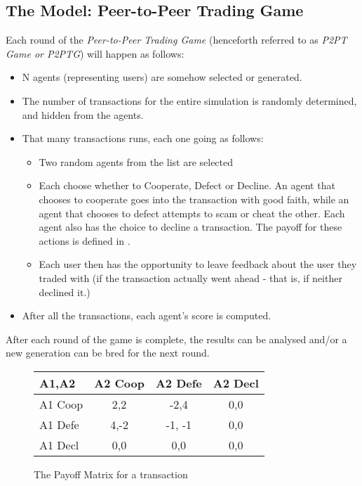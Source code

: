 \documentclass{article}
\begin{document}
\subsection{The Model: Peer-to-Peer Trading Game}
\label{sec:P2PTG}
Each round of the \emph{Peer-to-Peer Trading Game} (henceforth referred to as \emph{P2PT Game or P2PTG}) will happen as follows:
\begin{itemize}
	\item N agents (representing users) are somehow selected or generated.
	\item The number of transactions for the entire simulation is randomly determined, and hidden from the agents.
	\item That many transactions runs, each one going as follows:
	\begin{itemize}
		\item Two random agents from the list are selected
		\item Each choose whether to Cooperate, Defect or Decline. An agent that chooses to cooperate goes into the transaction with good faith, while an agent that chooses to defect attempts to scam or cheat the other. Each agent also has the choice to decline a transaction. The payoff for these actions is defined in .
		\item Each user then has the opportunity to leave feedback about the user they traded with (if the transaction actually went ahead - that is, if neither declined it.)
	\end{itemize}
	\item After all the transactions, each agent's score is computed.
\end{itemize}

After each round of the game is complete, the results can be analysed and/or a new generation can be bred for the next round.
\begin{figure}[h]
	\begin{center}
		\label{fig:model-payoff}
		\caption{The Payoff Matrix for a transaction}
		\begin{tabular}{| l || c | c | c |}
			\hline
			A1,A2 & A2 Coop & A2 Defe & A2 Decl \\ \hline
			A1 Coop & 2,2 & -2,4 & 0,0 \\ \hline  
			A1 Defe & 4,-2 & -1, -1 & 0,0 \\ \hline
			A1 Decl & 0,0 & 0,0 & 0,0 \\ \hline
		\end{tabular}
	\end{center}
\end{figure}
\end{document}
